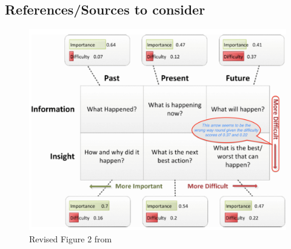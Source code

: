 \subsection{References/Sources to consider}
\begin{figure}
    \centering
    \includegraphics[width=13cm]{images/related-work/buse2012-edited-figure-2.png}
    \caption{Revised Figure 2 from~\citep{buse2012_information_needs_for_software_development_analytics}}
    \label{fig:buse2012-edited-figure-2}
\end{figure}
